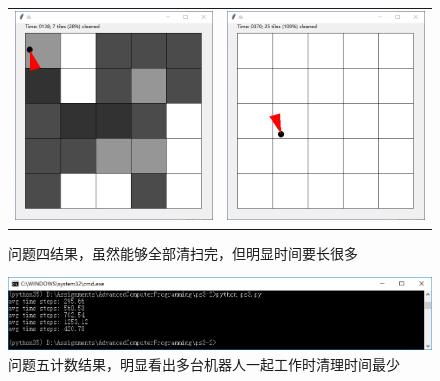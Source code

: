 \documentclass[logo,reportComp]{thesis}
\begin{document}
\begin{figure}[H]
\centering
\begin{tabular}{cc}
\includegraphics[width=0.4\linewidth]{fig/problem4-1.png}&
\includegraphics[width=0.4\linewidth]{fig/problem4-2.png}
\end{tabular}
\caption{问题四结果，虽然能够全部清扫完，但明显时间要长很多}
\label{fig:4}
\end{figure}

\begin{figure}[H]
\centering
\includegraphics[width=\linewidth]{fig/problem5.png}
\caption{问题五计数结果，明显看出多台机器人一起工作时清理时间最少}
\label{fig:5}
\end{figure}
\end{document}
